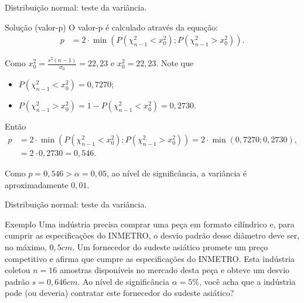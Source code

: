 \documentclass[8pt]{beamer}
\begin{document}
\begin{frame}{Distribuição normal: teste da variância.}

\begin{block}{Solução (valor-p)}
	O valor-p é calculado através da equação:
	\begin{align*}
	p &= 2 \cdot \min \left(P\left( \chi_{n-1}^2 < x_0^2 \right); P\left( \chi_{n-1}^2 > x_0^2 \right)  \right).
	\end{align*}
\end{block}
\vfill

Como $x_0^2 = \frac{s^2(n-1)}{\sigma_0} = 22,23$ e $ x_0^2  = 22,23$. Note que
\begin{itemize}
	\item $P\left( \chi_{n-1}^2 < x_0^2 \right) = 0,7270$;
	\item $P\left( \chi_{n-1}^2 > x_0^2 \right) = 1 - P\left( \chi_{n-1}^2 < x_0^2 \right) = 0,2730$.
\end{itemize}
Então
\begin{align*}
	p &= 2 \cdot \min \left(P\left( \chi_{n-1}^2 < x_0^2 \right); P\left( \chi_{n-1}^2 > x_0^2 \right)  \right)=  2 \cdot \min\left(0,7270; 0,2730  \right),\\
	&= 2 \cdot 0,2730 =  0,546.
\end{align*}
\vfill

Como $p=0,546 > \alpha=0,05$, ao nível de significância, a variância é aproximadamente $0,01$.
\end{frame}

\begin{frame}{Distribuição normal: teste da variância.}
	
\large	
\begin{block}{Exemplo}
		Uma indústria precisa comprar uma peça em formato cilíndrico e, para cumprir as especificações do INMETRO, o desvio padrão desse diâmetro deve ser, no máximo, $0,5cm$. Um fornecedor do sudeste asiático promete um preço competitivo e afirma que cumpre as especificações do INMETRO. Esta indústria coletou $n=16$ amostras disponíveis no mercado desta peça e obteve um desvio padrão $s=0,646cm$. Ao nível de significância $\alpha=5\%$, você acha que a indústria pode (ou deveria) contratar este fornecedor do sudeste asiático?
	\end{block}
	\vfill
\normalsize
\end{frame}
\end{document}
